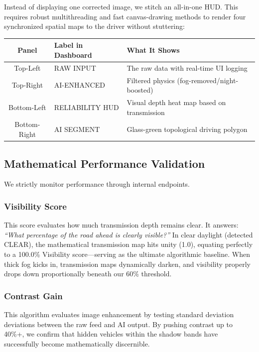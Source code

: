 \documentclass[12pt, a4paper]{article}
\begin{document}
Instead of displaying one corrected image, we stitch an all-in-one HUD. This requires robust multithreading and fast canvas-drawing methods to render four synchronized spatial maps to the driver without stuttering:
\begin{center}
\begin{tabular}{cll}
  \toprule
  \textbf{Panel} & \textbf{Label in Dashboard} & \textbf{What It Shows}\\
  \midrule
  Top-Left     & RAW INPUT               & The raw data with real-time UI logging\\
  Top-Right    & AI-ENHANCED             & Filtered physics (fog-removed/night-boosted)\\
  Bottom-Left  & RELIABILITY HUD         & Visual depth heat map based on transmission\\
  Bottom-Right & AI SEGMENT              & Glass-green topological driving polygon\\
  \bottomrule
\end{tabular}
\end{center}

\subsection{Mathematical Performance Validation}

We strictly monitor performance through internal endpoints.

\subsubsection{Visibility Score}
This score evaluates how much transmission depth remains clear. It answers: \textit{``What percentage of the road ahead is clearly visible?''} In clear daylight (detected CLEAR), the mathematical transmission map hits unity (1.0), equating perfectly to a 100.0\% Visibility score—serving as the ultimate algorithmic baseline. When thick fog kicks in, transmission maps dynamically darken, and visibility properly drops down proportionally beneath our 60\% threshold.

\subsubsection{Contrast Gain}
This algorithm evaluates image enhancement by testing standard deviation deviations between the raw feed and AI output. By pushing contrast up to 40\%+, we confirm that hidden vehicles within the shadow bands have successfully become mathematically discernible.
\end{document}
